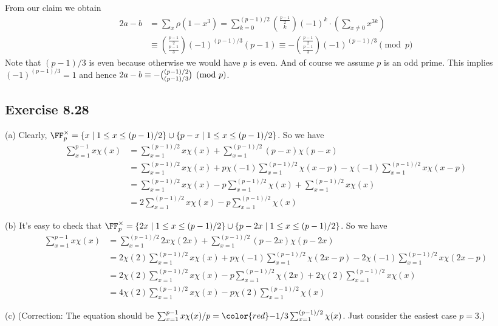 \documentclass[../Chapter.tex]{subfiles}
\begin{document}
From our claim we obtain
\begin{align*}
2a-b &= \sum_x \rho(1-x^3) = \sum_{k=0}^{(p-1)/2}\binom{\frac{p-1}{2}}{k}(-1)^k\cdot\left(\sum_{x\neq0} x^{3k}\right) \\
&\equiv \binom{\frac{p-1}{2}}{\frac{p-1}{3}}(-1)^{(p-1)/3}(p-1) \equiv -\binom{\frac{p-1}{2}}{\frac{p-1}{3}}(-1)^{(p-1)/3} \pmod{p}
\end{align*}
Note that $(p-1)/3$ is even because otherwise we would have $p$ is even. And of course we assume $p$ is an odd prime. This implies $(-1)^{(p-1)/3}=1$ and hence $2a-b\equiv -\tbinom{(p-1)/2}{(p-1)/3} \pmod{p}$.


\subsection*{Exercise 8.28}

(a) Clearly, $\FF_p^\times = \{x\mid 1\leq x\leq (p-1)/2\}\cup\{p-x\mid 1\leq x\leq(p-1)/2\}$. So we have
\begin{align*}
\sum_{x=1}^{p-1} x\chi(x) &= \sum_{x=1}^{(p-1)/2} x\chi(x) + \sum_{x=1}^{(p-1)/2} (p-x)\chi(p-x) \\
&= \sum_{x=1}^{(p-1)/2} x\chi(x) + p\chi(-1)\sum_{x=1}^{(p-1)/2} \chi(x-p) - \chi(-1)\sum_{x=1}^{(p-1)/2} x\chi(x-p) \\
&= \sum_{x=1}^{(p-1)/2} x\chi(x) - p\sum_{x=1}^{(p-1)/2} \chi(x) + \sum_{x=1}^{(p-1)/2} x\chi(x) \\
&= 2\sum_{x=1}^{(p-1)/2} x\chi(x) - p\sum_{x=1}^{(p-1)/2} \chi(x)
\end{align*}

(b) It's easy to check that $\FF_p^\times = \{2x\mid 1\leq x\leq (p-1)/2\}\cup\{p-2x\mid 1\leq x\leq(p-1)/2\}$. So we have
\begin{align*}
\sum_{x=1}^{p-1} x\chi(x) &= \sum_{x=1}^{(p-1)/2} 2x\chi(2x) + \sum_{x=1}^{(p-1)/2} (p-2x)\chi(p-2x) \\
&= 2\chi(2)\sum_{x=1}^{(p-1)/2} x\chi(x) + p\chi(-1)\sum_{x=1}^{(p-1)/2} \chi(2x-p) - 2\chi(-1)\sum_{x=1}^{(p-1)/2} x\chi(2x-p) \\
&= 2\chi(2)\sum_{x=1}^{(p-1)/2} x\chi(x) - p\sum_{x=1}^{(p-1)/2} \chi(2x) + 2\chi(2)\sum_{x=1}^{(p-1)/2} x\chi(x) \\
&= 4\chi(2)\sum_{x=1}^{(p-1)/2} x\chi(x) - p\chi(2)\sum_{x=1}^{(p-1)/2} \chi(x) 
\end{align*}

(c) (Correction: The equation should be $\sum_{x=1}^{p-1}x\chi(x)/p={\color{red}-}1/3\sum_{x=1}^{(p-1)/2} \chi(x)$. Just consider the easiest case $p=3$.)
\end{document}

